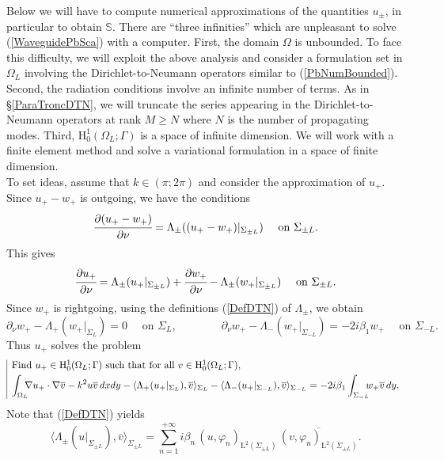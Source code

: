 \documentclass[11pt,a4paper]{report}
\newcommand{\dsp}{\displaystyle}
\newcommand{\Om}{\Omega}
\newcommand{\mrm}[1]{\mathrm{#1}}
\newcommand{\mL}{\mrm{L}}
\newcommand{\mH}{\mrm{H}}
\begin{document}
Below we will have to compute numerical approximations of the quantities $u_\pm$, in particular to obtain $\mathbb{S}$. There are ``three infinities''  which are unpleasant to solve (\ref{WaveguidePbSca}) with a computer. First, the domain $\Om$ is unbounded. To face this difficulty, we will exploit the above analysis and consider a formulation set in $\Om_L$ involving the Dirichlet-to-Neumann operators similar to (\ref{PbNumBounded}). Second, the radiation conditions involve an infinite number of terms. As in \S\ref{ParaTroncDTN}, we will truncate the series appearing in the Dirichlet-to-Neumann operators at rank $M\ge N$ where $N$ is the number of propagating modes. Third, $\mH^1_0(\Om_L;\Gamma)$ is a space of infinite dimension. 
We will work with a finite element method and solve a variational formulation in a space of finite dimension.\\
\newline
To set ideas, assume that $k\in(\pi;2\pi)$ and consider the approximation of $u_+$. Since $u_+-w_+$ is outgoing, we have the conditions
\[
\cfrac{\partial (u_+-w_+)}{\partial \nu} =  \Lambda_\pm((u_+-w_+)|_{\Sigma_{\pm L}}) \quad \mbox{ on }\Sigma_{\pm L}.
\]
This gives 
\[
\cfrac{\partial u_+}{\partial \nu} =  \Lambda_\pm(u_+|_{\Sigma_{\pm L}})+\cfrac{\partial w_+}{\partial \nu}-\Lambda_\pm(w_+|_{\Sigma_{\pm L}}) \quad \mbox{ on }\Sigma_{\pm L}.
\]
Since $w_+$ is rightgoing, using the definitions (\ref{DefDTN}) of $\Lambda_\pm$, we obtain 
\[
\partial_\nu w_+-\Lambda_+(w_+|_{\Sigma_{L}})=0\quad\mbox{ on }\Sigma_{L},\qquad\qquad \partial_\nu w_+-\Lambda_-(w_+|_{\Sigma_{-L}})=-2i\beta_1w_+\quad\mbox{ on }\Sigma_{-L}.
\]
Thus $u_+$ solves the problem
\begin{equation}\label{DefVariaD}
\begin{array}{|l}
\mbox{Find }u_+\in\mH^1_0(\Om_L;\Gamma) \mbox{ such that for all }v\in\mH^1_0(\Om_L;\Gamma),\\[3pt]
\dsp\int_{\Om_L}\hspace{-0.2cm}\nabla u_+\cdot\nabla\overline{v}-k^2 u\overline{v}\,dxdy-\langle\Lambda_+(u_+|_{\Sigma_{L}}),\overline{v} \rangle_{\Sigma_L}-\langle\Lambda_-(u_+|_{\Sigma_{-L}}),\overline{v} \rangle_{\Sigma_{-L}}=-2i\beta_1\int_{\Sigma_{-L}}\hspace{-0.2cm}w_+\overline{v}\,dy.
\end{array}
\end{equation}
Note that (\ref{DefDTN}) yields
\[
\langle\Lambda_\pm(u|_{\Sigma_{\pm L}}),\overline{v}\rangle_{\Sigma_{\pm L}} = \dsp\sum_{n=1}^{+\infty} i\beta_n\, (u,\varphi_n)_{\mL^2(\Sigma_{\pm L})}\,\overline{(v,\varphi_n)_{\mL^2(\Sigma_{\pm L})}}.
\]
\end{document}
